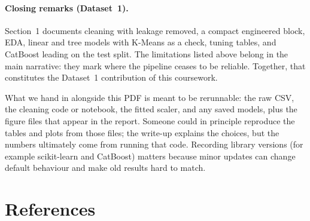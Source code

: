 \documentclass[12pt,a4paper]{article}
\begin{document}
\paragraph{Closing remarks (Dataset~1).}
Section~1 documents cleaning with leakage removed, a compact engineered block, EDA, linear and tree models with K-Means as a check, tuning tables, and CatBoost leading on the test split. The limitations listed above belong in the main narrative: they mark where the pipeline ceases to be reliable. Together, that constitutes the Dataset~1 contribution of this coursework.

What we hand in alongside this PDF is meant to be rerunnable: the raw CSV, the cleaning code or notebook, the fitted scaler, and any saved models, plus the figure files that appear in the report. Someone could in principle reproduce the tables and plots from those files; the write-up explains the choices, but the numbers ultimately come from running that code. Recording library versions (for example scikit-learn and CatBoost) matters because minor updates can change default behaviour and make old results hard to match.

\newpage
\section{References}
\end{document}
